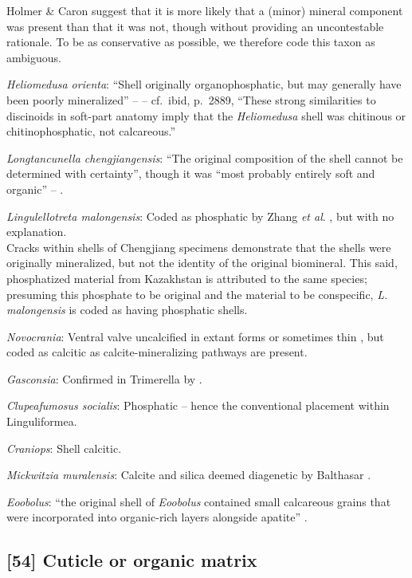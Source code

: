 \documentclass[]{book}
\theoremstyle{definition}
\theoremstyle{definition}
\theoremstyle{definition}
\theoremstyle{remark}
\begin{document}
Holmer \& Caron \citeyearpar[p.~286]{Holmer2006Aspinose} suggest that it
is more likely that a (minor) mineral component was present than that it
was not, though without providing an uncontestable rationale. To be as
conservative as possible, we therefore code this taxon as ambiguous.

\emph{Heliomedusa orienta}: ``Shell originally organophosphatic, but may
generally have been poorly mineralized'' -- \citet{Williams2007PartH} --
cf.~ibid, p.~2889, ``These strong similarities to discinoids in
soft-part anatomy imply that the \emph{Heliomedusa} shell was chitinous
or chitinophosphatic, not calcareous.''

\emph{Longtancunella chengjiangensis}: ``The original composition of the
shell cannot be determined with certainty'', though it was ``most
probably entirely soft and organic'' --
\citet{Zhang2011Theexceptionally}.

\emph{Lingulellotreta malongensis}: Coded as phosphatic by Zhang
\emph{et al}. \citeyearpar{Zhang2014Anearly}, but with no explanation.\\
Cracks within shells of Chengjiang specimens \citep[e.g.][fig.
3]{Zhang2007Noteon} demonstrate that the shells were originally
mineralized, but not the identity of the original biomineral. This said,
phosphatized material from Kazakhstan \citep{Holmer1997EarlyCambrian} is
attributed to the same species; presuming this phosphate to be original
and the material to be conspecific, \emph{L. malongensis} is coded as
having phosphatic shells.

\emph{Novocrania}: Ventral valve uncalcified in extant forms or
sometimes thin \citep{Williams2000BrachiopodaLinguliformea}, but coded
as calcitic as calcite-mineralizing pathways are present.

\emph{Gasconsia}: Confirmed in Trimerella by
\citet{Balthasar2011Relicaragonite}.

\emph{Clupeafumosus socialis}: Phosphatic -- hence the conventional
placement within Linguliformea.

\emph{Craniops}: Shell calcitic.

\emph{Mickwitzia muralensis}: Calcite and silica deemed diagenetic by
Balthasar \citeyearpar{Balthasar2004Shellstructure}.

\emph{Eoobolus}: ``the original shell of \emph{Eoobolus} contained small
calcareous grains that were incorporated into organic-rich layers
alongside apatite'' \citep{Balthasar2007Anearly}.

\hypertarget{cuticle-or-organic-matrix}{%
\subsection*{{[}54{]} Cuticle or organic
matrix}\label{cuticle-or-organic-matrix}}
\end{document}
